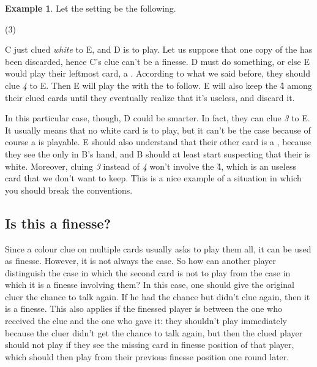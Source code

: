 \documentclass[a4paper]{article}
\theoremstyle{plain}
\theoremstyle{definition}
\newtheorem{example}[theorem]{Example}
\begin{document}
\begin{example}
	
	Let the setting be the following.
	
	\begin{tasks}(3)
		\task[+]      
		\task[A]    
		\task[B]    
		\task[C]    
		\task[D]    
		\task[E]    
	\end{tasks}
	
	C just clued \textit{white} to E, and D is to play. Let us suppose that one copy of the  has been discarded, hence C's clue can't be a finesse. D must do something, or else E would play their leftmost card, a . According to what we said before, they should clue \textit{4} to E. Then E will play the  with the  to follow. E will also keep the \G{4} among their clued cards until they eventually realize that it's useless, and discard it.
	
	In this particular case, though, D could be smarter. In fact, they can clue \textit{3} to E. It usually means that no white card is to play, but it can't be the case because of course a  is playable. E should also understand that their other card is a , because they see the only  in B's hand, and B should at least start suspecting that their  is white. Moreover, cluing \textit{3} instead of \textit{4} won't involve the \G{4}, which is an useless card that we don't want to keep. This is a nice example of a situation in which you should break the conventions.
	
\end{example}

\subsection{Is this a finesse?}

Since a colour clue on multiple cards usually asks to play them all, it can be used as finesse. However, it is not always the case. So how can another player distinguish the case in which the second card is not to play from the case in which it is a finesse involving them? In this case, one should give the original cluer the chance to talk again. If he had the chance but didn't clue again, then it is a finesse. This also applies if the finessed player is between the one who received the clue and the one who gave it: they shouldn't play immediately because the cluer didn't get the chance to talk again, but then the clued player should not play if they see the missing card in finesse position of that player, which should then play from their previous finesse position one round later.
\end{document}
